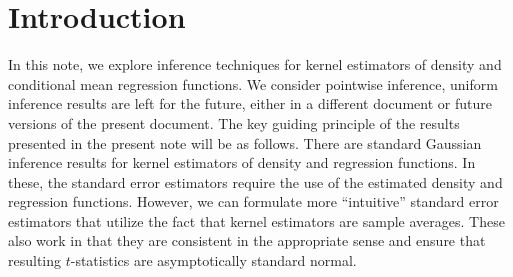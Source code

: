 
\section{Introduction}

In this note, we explore inference techniques for kernel estimators of density
and conditional mean regression functions.
We consider pointwise inference, uniform inference results are left for the
future, either in a different document or future versions of the present
document.
The key guiding principle of the results presented in the present note will be
as follows.
There are standard Gaussian inference results for kernel estimators of density
and regression functions.
In these, the standard error estimators require the use of the estimated density
and regression functions.
However, we can formulate more ``intuitive'' standard error estimators that
utilize the fact that kernel estimators are sample averages.
These also work in that they are consistent in the appropriate sense and ensure
that resulting \(t\)-statistics are asymptotically standard normal.


